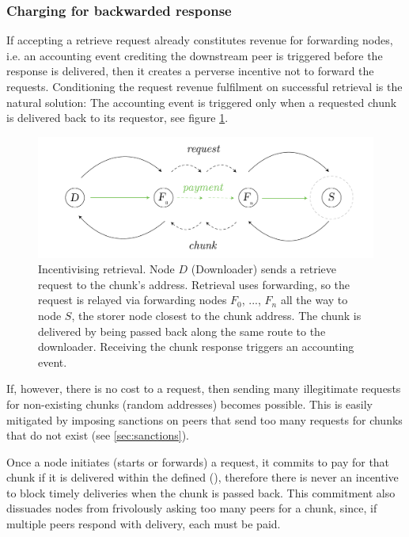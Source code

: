 \subsubsection{Charging for backwarded response}

If accepting a retrieve request already constitutes revenue for forwarding nodes, i.e. an accounting event crediting the downstream peer is triggered before the response is delivered, then it creates a perverse incentive not to forward the requests. Conditioning the request revenue fulfilment on successful retrieval is the natural solution: The accounting event is triggered only when a requested chunk is delivered back to its requestor, see figure \ref{fig:retrieval-payment}.


\begin{figure}[htbp]
   \centering
   \includegraphics[width=\textwidth]{fig/retrieval-payment.pdf}
   \caption[Incentivising retrieval \statusgreen]{Incentivising retrieval. Node $D$ (Downloader) sends a retrieve request to the chunk's address. Retrieval uses forwarding, so the request is relayed via forwarding nodes $F_0$, ..., $F_n$ all the way to node $S$, the storer node closest to the chunk address. The chunk is delivered by being passed back along the same route to the downloader. Receiving the chunk response triggers an accounting event.}
   \label{fig:retrieval-payment}
\end{figure}

If, however, there is no cost to a request, then sending many illegitimate requests for non-existing chunks (random addresses) becomes possible. This is easily mitigated by imposing sanctions on peers that send too many requests for chunks that do not exist (see \ref{sec:sanctions}).

Once a node initiates (starts or forwards) a request, it commits to pay for that chunk if it is delivered within the defined  (), therefore there is never an incentive to block timely deliveries when the chunk is passed back.  This commitment also dissuades nodes from frivolously asking too many peers for a chunk, since, if multiple peers respond with delivery, each must be paid.


